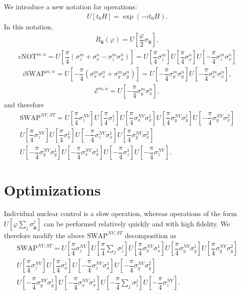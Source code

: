 \documentclass[11pt]{article}
\renewcommand{\t}{\text} %
\newcommand{\f}[2]{\dfrac{#1}{#2}} %
\newcommand{\p}[1]{\left(#1\right)} %
\renewcommand{\sp}[1]{\left[#1\right]} %
\renewcommand{\v}{\bm} %
\newcommand{\uv}[1]{\hat{\v{#1}}} %
\renewcommand{\phi}{\varphi} %
\newcommand{\E}{\mathcal E}
\begin{document}
We introduce a new notation for operations:
\begin{align}
  U\sp{t_0H}=\exp\p{-it_0 H}.
\end{align}
In this notation,
\begin{align}
  R_{\uv n}\p\phi=U\sp{\f\phi2\sigma_{\uv n}},
\end{align}
\begin{align}
  \t{cNOT}^{m,n}=U\sp{\f\pi4\p{\sigma_z^m+\sigma_x^n
      -\sigma_z^m\sigma_x^n}}
  =U\sp{\f\pi4\sigma_z^m}U\sp{\f\pi4\sigma_x^n}
  U\sp{-\f\pi4\sigma_z^m\sigma_x^n}
\end{align}
\begin{align}
  i\t{SWAP}^{m,n}=U\sp{-\f\pi4\p{\sigma_x^m\sigma_x^n
      +\sigma_y^m\sigma_y^n}} =U\sp{-\f\pi4\sigma_y^m\sigma_y^n}
  U\sp{-\f\pi4\sigma_x^m\sigma_x^n},
\end{align}
\begin{align}
  \E^{m,n}=U\sp{-\f\pi4\sigma_y^m\sigma_x^n},
\end{align}
and therefore
\begin{multline}
  \t{SWAP}^{NV,ST}= U\sp{\f\pi4\sigma_z^{NV}}U\sp{\f\pi4\sigma_z^1}
  U\sp{\f\pi4\sigma_x^{NV}\sigma_x^1}
  U\sp{\f\pi4\sigma_y^{NV}\sigma_y^1}
  U\sp{-\f\pi4\sigma_y^{NV}\sigma_x^2} \\
  U\sp{\f\pi4\sigma_z^{NV}}U\sp{\f\pi4\sigma_x^1}
  U\sp{-\f\pi4\sigma_z^{NV}\sigma_x^1}
  U\sp{\f\pi4\sigma_y^{NV}\sigma_x^2} \\
  U\sp{-\f\pi4\sigma_y^{NV}\sigma_y^1}
  U\sp{-\f\pi4\sigma_x^{NV}\sigma_x^1}
  U\sp{-\f\pi4\sigma_z^1}U\sp{-\f\pi4\sigma_z^{NV}}.
\end{multline}

\section*{Optimizations}

Individual nuclear control is a slow operation, whereas operations of
the form $U\sp{\phi\sum_j\sigma_{\uv n}^j}$ can be performed
relatively quickly and with high fidelity. We therefore modify the
above $\t{SWAP}^{NV,ST}$ decomposition as
\begin{multline}
  \t{SWAP}^{NV,ST}=
  U\sp{\f\pi4\sigma_z^{NV}}U\sp{\f\pi4\sum_j\sigma_z^j}
  U\sp{\f\pi4\sigma_x^{NV}\sigma_x^1}
  U\sp{\f\pi4\sigma_y^{NV}\sigma_y^1}
  U\sp{\f\pi4\sigma_y^{NV}\sigma_y^2} \\
  U\sp{\f\pi4\sigma_z^{NV}}U\sp{\f\pi4\sigma_x^1}
  U\sp{-\f\pi4\sigma_z^{NV}\sigma_x^1}
  U\sp{-\f\pi4\sigma_y^{NV}\sigma_y^2} \\
  U\sp{-\f\pi4\sigma_y^{NV}\sigma_y^1}
  U\sp{-\f\pi4\sigma_x^{NV}\sigma_x^1}
  U\sp{-\f\pi4\sum_j\sigma_z^j}U\sp{-\f\pi4\sigma_z^{NV}}.
\end{multline}
\end{document}
